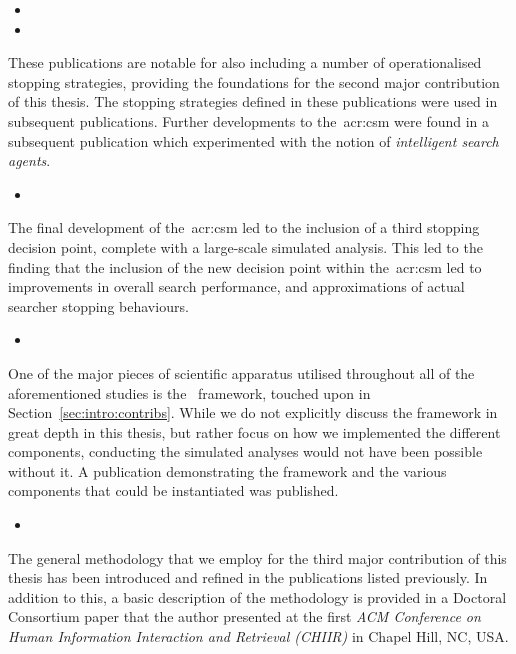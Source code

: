 \begin{itemize}
    \item{}
    \item{}
\end{itemize}

These publications are notable for also including a number of operationalised stopping strategies, providing the foundations for the second major contribution of this thesis. The stopping strategies defined in these publications were used in subsequent publications. Further developments to the~\gls{acr:csm} were found in a subsequent publication which experimented with the notion of \emph{intelligent search agents}.

\begin{itemize}
    \item{}
\end{itemize}

The final development of the~\gls{acr:csm} led to the inclusion of a third stopping decision point, complete with a large-scale simulated analysis. This led to the finding that the inclusion of the new decision point within the~\gls{acr:csm} led to improvements in overall search performance, and approximations of actual searcher stopping behaviours.

\begin{itemize}
    \item{}
\end{itemize}

\noindent
{}
One of the major pieces of scientific apparatus utilised throughout all of the aforementioned studies is the \simiir~framework, touched upon in Section~\ref{sec:intro:contribs}. While we do not explicitly discuss the framework in great depth in this thesis, but rather focus on how we implemented the different components, conducting the simulated analyses would not have been possible without it. A publication demonstrating the framework and the various components that could be instantiated was published.

\begin{itemize}
    \item{}
\end{itemize}

\noindent
{}
The general methodology that we employ for the third major contribution of this thesis has been introduced and refined in the publications listed previously. In addition to this, a basic description of the methodology is provided in a Doctoral Consortium paper that the author presented at the first \emph{ACM Conference on Human Information Interaction and Retrieval (CHIIR)} in Chapel Hill, NC, USA.

